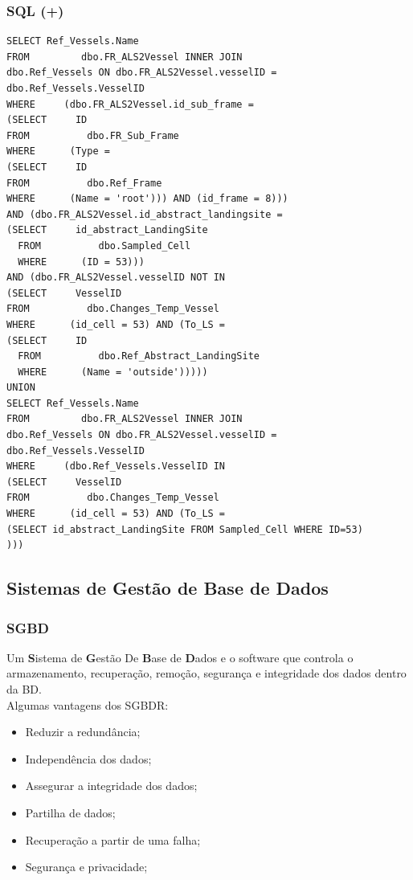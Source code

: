 \documentclass[hyperref={pdfpagelabels=true}]{beamer}
\begin{document}
\begin{frame}[fragile]
\frametitle{SQL (+)}
\lstset{language=SQL}
\tiny{
\begin{lstlisting}
SELECT Ref_Vessels.Name	
FROM         dbo.FR_ALS2Vessel INNER JOIN
dbo.Ref_Vessels ON dbo.FR_ALS2Vessel.vesselID = dbo.Ref_Vessels.VesselID
WHERE     (dbo.FR_ALS2Vessel.id_sub_frame =
(SELECT     ID
FROM          dbo.FR_Sub_Frame
WHERE      (Type =
(SELECT     ID
FROM          dbo.Ref_Frame
WHERE      (Name = 'root'))) AND (id_frame = 8)))
AND (dbo.FR_ALS2Vessel.id_abstract_landingsite =
(SELECT     id_abstract_LandingSite
  FROM          dbo.Sampled_Cell
  WHERE      (ID = 53)))
AND (dbo.FR_ALS2Vessel.vesselID NOT IN
(SELECT     VesselID
FROM          dbo.Changes_Temp_Vessel
WHERE      (id_cell = 53) AND (To_LS =
(SELECT     ID
  FROM          dbo.Ref_Abstract_LandingSite
  WHERE      (Name = 'outside')))))
UNION
SELECT Ref_Vessels.Name	
FROM         dbo.FR_ALS2Vessel INNER JOIN
dbo.Ref_Vessels ON dbo.FR_ALS2Vessel.vesselID = dbo.Ref_Vessels.VesselID
WHERE     (dbo.Ref_Vessels.VesselID IN
(SELECT     VesselID
FROM          dbo.Changes_Temp_Vessel
WHERE      (id_cell = 53) AND (To_LS = 
(SELECT id_abstract_LandingSite FROM Sampled_Cell WHERE ID=53)							
)))
\end{lstlisting}
}
\end{frame}

\subsection{Sistemas de Gest\~{a}o de Base de Dados}
\begin{frame}
\frametitle{SGBD}
Um \textbf{S}istema de \textbf{G}est\~{a}o De \textbf{B}ase de \textbf{D}ados e o software que controla o armazenamento,
recupera\c{c}\~{a}o, remo\c{c}\~{a}o, seguran\c{c}a e integridade dos dados dentro da BD.\\
Algumas vantagens dos SGBDR:
\begin{itemize}
\item<2-> Reduzir a redund\^{a}ncia;%
\item<3-> Independ\^{e}ncia dos dados;%
\item<4-> Assegurar a integridade dos dados;%
\item<5-> Partilha de dados;%
\item<7-> Recupera\c{c}\~{a}o a partir de uma falha;%
\item<8-> Seguran\c{c}a e privacidade;%
\end{itemize}
\end{frame}
\end{document}
